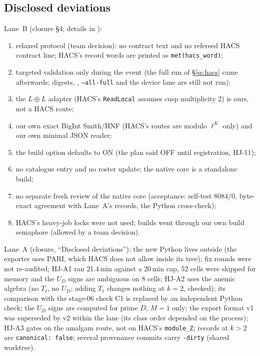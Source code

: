 \subsection{Disclosed deviations}\label{ss:hacs-dev}
Lane~B (closure \S4; details in ):
\begin{enumerate}[label=D\arabic*,leftmargin=2.2em]
\item relaxed protocol (team decision): no contract text and no refereed HACS contract line; HACS's record words are printed
  as \texttt{met(hacs\_word)};
\item targeted validation only during the event (the full run of \S\ref{ss:hacs} came afterwards; digests,
  , \texttt{--all-full} and the device lane are still not run);
\item the $L\oplus L$ adapter (HACS's \texttt{ReadLocal} assumes cusp multiplicity 2) is ours, not a HACS route;
\item our own exact BigInt Smith/HNF (HACS's routes are modulo $\ell^K$ only) and our own minimal JSON reader;
\item the build option  defaults to ON (the plan said OFF until registration, HJ-11);
\item no catalogue entry and no roster update; the native core is a standalone build;
\item no separate fresh review of the native core (acceptance: self-test 8084/0, byte-exact agreement with Lane~A's
  records, the Python cross-check);
\item HACS's heavy-job locks were not used; builds went through our own build semaphore (allowed by a team decision).
\end{enumerate}
Lane~A (closure, ``Disclosed deviations''): the new Python lives outside  (the exporter uses PARI, which
HACS does not allow inside its tree); fix rounds were not re-audited; HJ-A1 ran 21.4\,min against a 20\,min cap, 52 cells
were skipped for memory and the $U_D$ signs are ambiguous on 8 cells; HJ-A2 uses the anemic algebra (no $T_\ell$, no
$U_D$; adding $T_\ell$ changes nothing at $k=2$, checked); its comparison with the stage-06 check C1 is replaced by an independent Python check; the $U_D$ signs are computed for prime $D$, $M=1$ only; the export format v1 was superseded by v2 within the lane (its class order depended on the process); HJ-A3 gates on the amalgam route, not on HACS's
\texttt{module\_Z}; records at $k>2$ are \texttt{canonical: false}; several provenance commits carry \texttt{-dirty}
(shared worktree).

